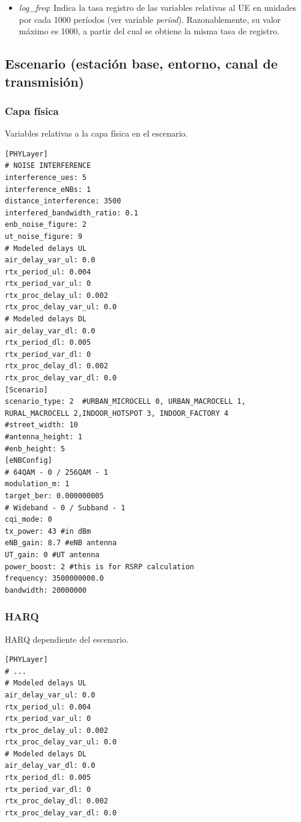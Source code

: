 \documentclass[12pt]{report} %
\begin{document}
\begin{itemize}
\item \textit{log\_freq}: Indica la tasa registro de las variables relativas al UE en unidades por cada 1000 períodos (ver variable \textit{period}). Razonablemente, su valor máximo es 1000, a partir del cual se obtiene la misma tasa de registro.
\end{itemize}

\subsection* {Escenario (estación base, entorno, canal de transmisión)}

\subsubsection* {Capa física}

Variables relativas a la capa física en el escenario.

\begin{lstlisting}
[PHYLayer]
# NOISE INTERFERENCE
interference_ues: 5
interference_eNBs: 1
distance_interference: 3500
interfered_bandwidth_ratio: 0.1
enb_noise_figure: 2
ut_noise_figure: 9
# Modeled delays UL
air_delay_var_ul: 0.0
rtx_period_ul: 0.004
rtx_period_var_ul: 0
rtx_proc_delay_ul: 0.002
rtx_proc_delay_var_ul: 0.0
# Modeled delays DL
air_delay_var_dl: 0.0
rtx_period_dl: 0.005
rtx_period_var_dl: 0
rtx_proc_delay_dl: 0.002
rtx_proc_delay_var_dl: 0.0
[Scenario]
scenario_type: 2  #URBAN_MICROCELL 0, URBAN_MACROCELL 1, RURAL_MACROCELL 2,INDOOR_HOTSPOT 3, INDOOR_FACTORY 4
#street_width: 10
#antenna_height: 1
#enb_height: 5
[eNBConfig]
# 64QAM - 0 / 256QAM - 1
modulation_m: 1
target_ber: 0.000000005
# Wideband - 0 / Subband - 1
cqi_mode: 0
tx_power: 43 #in dBm
eNB_gain: 8.7 #eNB antenna
UT_gain: 0 #UT antenna
power_boost: 2 #this is for RSRP calculation
frequency: 3500000000.0
bandwidth: 20000000
\end{lstlisting}

\subsubsection* {HARQ}

HARQ dependiente del escenario.

\begin{lstlisting}
[PHYLayer]
# ...
# Modeled delays UL
air_delay_var_ul: 0.0
rtx_period_ul: 0.004
rtx_period_var_ul: 0
rtx_proc_delay_ul: 0.002
rtx_proc_delay_var_ul: 0.0
# Modeled delays DL
air_delay_var_dl: 0.0
rtx_period_dl: 0.005
rtx_period_var_dl: 0
rtx_proc_delay_dl: 0.002
rtx_proc_delay_var_dl: 0.0
\end{lstlisting}
\end{document}
